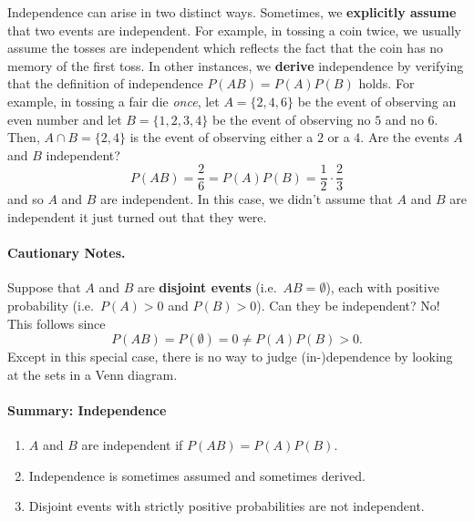 \documentclass[
  14pt,
]{memoir}
\providecommand{\tightlist}{%
  \setlength{\itemsep}{0pt}\setlength{\parskip}{0pt}}
\begin{document}
\bigskip

Independence can arise in two distinct ways. Sometimes, we \textbf{explicitly assume} that two events are independent. For example, in tossing a coin twice, we usually assume the tosses are independent which reflects the fact that the coin has no memory of the first toss. \newline 
In other instances, we \textbf{derive} independence by verifying that the definition of independence \(P(A B)=P(A)P(B)\) holds. For example, in tossing a fair die \textit{once}, let \(A=\{2,4,6\}\) be the event of observing an even number and let \(B=\{1,2,3,4\}\) be the event of observing no \(5\) and no \(6\). Then,
\(A \cap B=\{2,4\}\) is the event of observing either a \(2\) or a \(4\). Are the events \(A\) and \(B\) independent?\\
\[
P(A B)=\frac{2}{6}=P(A)P(B)=\frac{1}{2}\cdot \frac{2}{3}
\]
and so \(A\) and \(B\) are independent. In this case, we didn't assume that \(A\) and \(B\) are independent it just turned out that they were.

\bigskip

\paragraph*{Cautionary Notes.}

Suppose that \(A\) and \(B\) are \textbf{disjoint events} (i.e.~\(AB=\emptyset\)), each with positive probability (i.e.~\(P(A)>0\) and \(P(B)>0\)). Can they be independent? No! This follows since
\[
P(A B)=P(\emptyset)=0\neq P(A)P(B)>0.
\]
Except in this special case, there is no way to judge (in-)dependence by looking at the sets in a Venn diagram.

\bigskip

\paragraph*{Summary: Independence}
\vspace{-.3cm}

\begin{enumerate}
\def\labelenumi{\arabic{enumi}.}
\tightlist
\item
  \(A\) and \(B\) are independent if \(P(A B)=P(A) P(B)\).
\item
  Independence is sometimes assumed and sometimes derived.
\item
  Disjoint events with strictly positive probabilities are not independent.
\end{enumerate}
\end{document}
